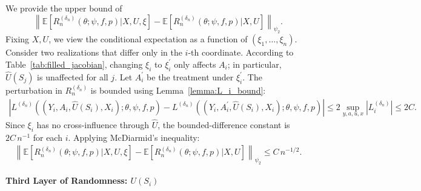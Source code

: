 \documentclass[12pt]{article}
\newcommand{\E}{\mathbb{E}}
\begin{document}
\noindent We provide the upper bound of
$$\left\|\E\left[R_n^{(\delta_n)}(\theta;\psi,f,p)|X,U,\xi\right]-\E\left[R_n^{(\delta_n)}(\theta;\psi,f,p)|X,U\right]\right\|_{\psi_2}.$$
Fixing $X,U$, we view the conditional expectation as a function of $(\xi_1,\ldots,\xi_n)$. Consider two realizations that differ only in the $i$-th coordinate. According to Table~\ref{tab:filled_jacobian}, changing $\xi_i$ to $\xi_i^\prime$ only affects $A_i$; in particular, $\widehat U(S_j)$ is unaffected for all $j$. Let $A_i^\prime$ be the treatment under $\xi_i^\prime$. The perturbation in $R_n^{(\delta_n)}$ is bounded using Lemma~\ref{lemma:L_i_bound}:
\begin{align*}
\left|L^{(\delta_n)}((Y_i,A_i,\widehat U(S_i),X_i);\theta,\psi,f,p) - L^{(\delta_n)}((Y_i,A_i^\prime,\widehat U(S_i),X_i);\theta,\psi,f,p)\right|
\leq 2\sup_{y,a,u,x}\left|L^{(\delta_n)}_i\right| \leq 2C.
\end{align*}
Since $\xi_i$ has no cross-influence through $\widehat U$, the bounded-difference constant is $2C\,n^{-1}$ for each $i$. Applying McDiarmid's inequality:
\begin{align*}
\left\|\E\left[R_n^{(\delta_n)}(\theta;\psi,f,p)|X,U,\xi\right]-\E\left[R_n^{(\delta_n)}(\theta;\psi,f,p)|X,U\right]\right\|_{\psi_2}
\leq C\,n^{-1/2}.
\end{align*}

\noindent\textbf{Third Layer of Randomness: $U(S_i)$}
\end{document}
